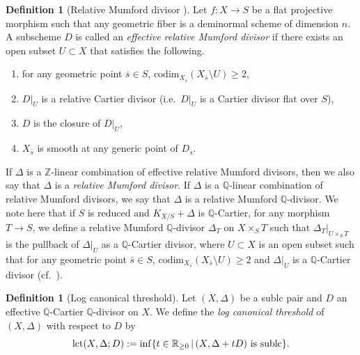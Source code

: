 \documentclass[12pt,twoside]{amsart}
\theoremstyle{definition}
\newtheorem{defn}[thm]{Definition}
\begin{document}
\begin{defn}[Relative Mumford divisor \cite{kollar-moduli}]
    Let $f\colon X\to S$ be a flat projective morphism such that any geometric fiber is a deminormal scheme of dimension $n$.
    A subscheme $D$ is called an {\it effective relative Mumford divisor} if there exists an open subset $U\subset X$ that satisfies the following.
    \begin{enumerate}
        \item for any geometric point $\bar{s}\in S$, $\mathrm{codim}_{X_{\bar{s}}}(X_{\bar{s}}\setminus U)\ge2$,
        \item $D|_U$ is a relative Cartier divisor (i.e.~$D|_U$ is a Cartier divisor flat over $S$),
  \item $D$ is the closure of $D|_U$,
  \item $X_{\bar{s}}$ is smooth at any generic point of $D_{\bar{s}}$.
  \end{enumerate}
  If $\Delta$ is a $\mathbb{Z}$-linear combination of effective relative Mumford divisors, then we also say that $\Delta$ is a {\it relative Mumford divisor}.
  If $\Delta$ is a $\mathbb{Q}$-linear combination of relative Mumford divisors, we say that $\Delta$ is a relative Mumford $\mathbb{Q}$-divisor.
We note here that if $S$ is reduced and $K_{X/S}+\Delta$ is $\mathbb{Q}$-Cartier, for any morphism $T\to S$, we define a relative Mumford $\mathbb{Q}$-divisor $\Delta_T$ on $X\times_ST$ such that $\Delta_T|_{U\times_ST}$ is the pullback of $\Delta|_U$ as a $\mathbb{Q}$-Cartier divisor, where $U\subset X$ is an open subset such that for any geometric point $\bar{s}\in S$, $\mathrm{codim}_{X_{\bar{s}}}(X_{\bar{s}}\setminus U)\ge2$ and $\Delta|_U$ is a $\mathbb{Q}$-Cartier divisor (cf.~\cite[4.3]{kollar-moduli}).
\end{defn}



\begin{defn}[Log canonical threshold]
    Let $(X,\Delta)$ be a sublc pair and $D$ an effective $\mathbb{Q}$-Cartier $\mathbb{Q}$-divisor on $X$.
    We define the {\it log canonical threshold} of $(X,\Delta)$ with respect to $D$ by
    \[
    \mathrm{lct}(X,\Delta;D):=
    {\rm inf}\{t \in \mathbb{R}_{\geq 0} \, | \, \text{$(X,\Delta + tD)$ is sublc}\}.
    \]
\end{defn}
\end{document}
